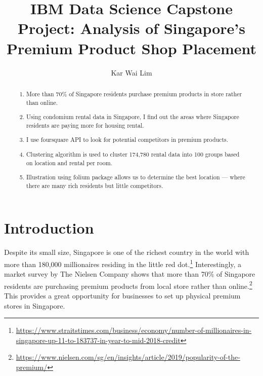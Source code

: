 \documentclass[oneside,11pt]{article}
\begin{document}
\title{IBM Data Science Capstone Project: Analysis of Singapore's Premium Product Shop Placement}

\author{Kar Wai Lim}

\maketitle


\renewcommand{\abstractname}{Executive Summary}
\begin{abstract}%
\noindent
\begin{enumerate}
\item 
  More than 70\% of Singapore residents purchase premium 
  products in store rather than online.

\item
  Using condomium rental data in Singapore, I find out 
  the areas where Singapore residents are paying more 
  for housing rental.

\item
  I use foursquare API to look for potential 
  competitors in premium products.

\item
  Clustering algorithm is used to cluster 174,780 rental
  data into 100 groups based on location and rental per room.

\item
  Illustration using folium package allows us to determine
  the best location --- where there are many rich residents
  but little competitors.

\end{enumerate}
\end{abstract}


\section{Introduction}

Despite its small size, Singapore is one of the richest country
in the world with more than 180,000 millionaires residing in
the little red dot.\footnote{\href{https://www.straitstimes.com/business/economy/number-of-millionaires-in-singapore-up-11-to-183737-in-year-to-mid-2018-credit}{https://www.straitstimes.com/business/economy/number-of-millionaires-in-singapore-up-11-to-183737-in-year-to-mid-2018-credit}}
Interestingly, a market survey by The Nielsen Company shows that
more than 70\% of Singapore residents are purchasing premium products 
from local store rather than online.\footnote{\href{https://www.nielsen.com/sg/en/insights/article/2019/popularity-of-the-premium/}{https://www.nielsen.com/sg/en/insights/article/2019/popularity-of-the-premium/}}
This provides a great opportunity for businesses to set up 
physical premium stores in Singapore.
\end{document}
